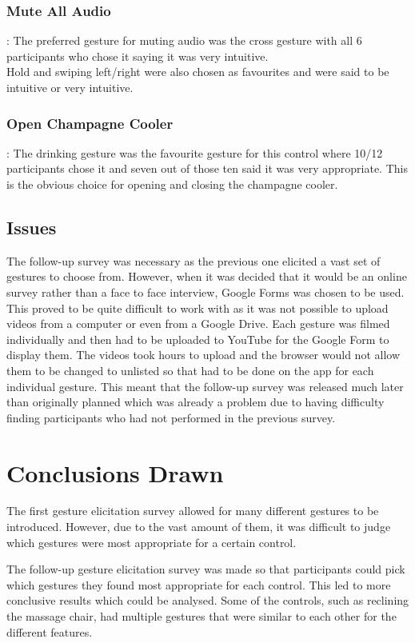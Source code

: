 \documentclass{l4proj}
\begin{document}
\subsubsection{Mute All Audio}: The preferred gesture for muting audio was the cross gesture with all 6 participants who chose it saying it was very intuitive.\\
Hold and swiping left/right were also chosen as favourites and were said to be intuitive or very intuitive.
\subsubsection{Open Champagne Cooler}: The drinking gesture was the favourite gesture for this control where 10/12 participants chose it and seven out of those ten said it was very appropriate.
This is the obvious choice for opening and closing the champagne cooler.

\subsection{Issues}
The follow-up survey was necessary as the previous one elicited a vast set of gestures to choose from. However, when it was decided that it would be an online survey rather than a face to face interview, Google Forms was chosen to be used. This proved to be quite difficult to work with as it was not possible to upload videos from a computer or even from a Google Drive. Each gesture was filmed individually and then had to be uploaded to YouTube for the Google Form to display them. The videos took hours to upload and the browser would not allow them to be changed to unlisted so that had to be done on the app for each individual gesture. This meant that the follow-up survey was released much later than originally planned which was already a problem due to having difficulty finding participants who had not performed in the previous survey.

\section{Conclusions Drawn}
\label{section:conclusions}
The first gesture elicitation survey allowed for many different gestures to be introduced. However, due to the vast amount of them, it was difficult to judge which gestures were most appropriate for a certain control. 

The follow-up gesture elicitation survey was made so that participants could pick which gestures they found most appropriate for each control. This led to more conclusive results which could be analysed. Some of the controls, such as reclining the massage chair, had multiple gestures that were similar to each other for the different features. 
\end{document}
